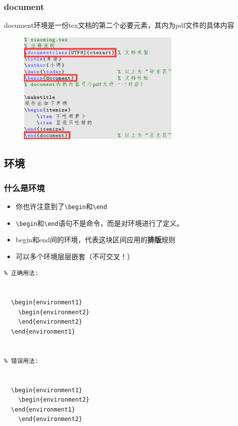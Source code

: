     \begin{frame}
        \frametitle{document}
        document环境是一份tex文档的第二个必要元素，其内为pdf文件的具体内容\pause
\begin{figure}
\centering
\includegraphics[width = 0.7\textwidth]{img//nece.png}
\end{figure}
    \end{frame}


\subsection{环境}
    \begin{frame}[fragile]
        \frametitle{什么是环境}
        \begin{itemize}
            \item 你也许注意到了\verb|\begin|和\verb|\end| \pause
            \item \verb|\begin|和\verb|\end|语句不是命令，而是对环境进行了定义。
            \item begin和end间的环境，代表这块区间应用的\textbf{排版}规则
            \item 可以多个环境层层嵌套（不可交叉！）
        \end{itemize}
    \end{frame}
    
    \begin{frame}[fragile]
\begin{lstlisting}
% 正确用法:


  \begin{environment1}
    \begin{environment2}
    \end{environment2}
  \end{environment1}


% 错误用法:


  \begin{environment1}
    \begin{environment2}
  \end{environment1}
    \end{environment2}

\end{lstlisting}
    \end{frame}
    
